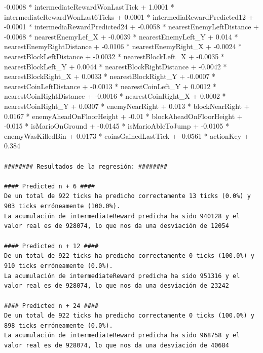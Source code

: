 \documentclass[10pt, spanish, pdftex]{../.template/template}
\begin{document}
{{   -0.0008 * intermediateRewardWonLastTick +
    1.0001 * intermediateRewardWonLast6Ticks +
    0.0001 * intermediaRewardPredicted12 +
   -0.0001 * intermediaRewardPredicted24 +
   -0.0058 * nearestEnemyLeftDistance +
   -0.0068 * nearestEnemyLef\_X +
   -0.0039 * nearestEnemyLeft\_Y +
    0.014  * nearestEnemyRightDistance +
   -0.0106 * nearestEnemyRight\_X +
   -0.0024 * nearestBlockLeftDistance +
   -0.0032 * nearestBlockLeft\_X +
   -0.0035 * nearestBlockLeft\_Y +
    0.0044 * nearestBlockRightDistance +
   -0.0042 * nearestBlockRight\_X +
    0.0033 * nearestBlockRight\_Y +
   -0.0007 * nearestCoinLeftDistance +
   -0.0013 * nearestCoinLeft\_Y +
    0.0012 * nearestCoinRightDistance +
   -0.0016 * nearestCoinRight\_X +
    0.0002 * nearestCoinRight\_Y +
    0.0307 * enemyNearRight +
    0.013  * blockNearRight +
    0.0167 * enemyAheadOnFloorHeight +
   -0.01   * blockAheadOnFloorHeight +
   -0.015  * isMarioOnGround +
   -0.0145 * isMarioAbleToJump +
   -0.0105 * enemyWasKilledBin +
    0.0173 * coinsGainedLastTick +
   -0.0561 * actionKey +
    0.384}
\newpage
{}\\\\
\texttt{\#\#\#\#\#\#\#\# Resultados de la regresión: \#\#\#\#\#\#\#\#\\\\
\#\#\#\# Predicted n + 6 \#\#\#\#\\
        De un total de 922 ticks ha predicho correctamente 13 ticks (0.0\%) y 903 ticks erróneamente (100.0\%).\\
        La acumulación de intermediateReward predicha ha sido 940128 y el valor real es de 928074, lo que nos da una desviación de 12054\\\\
        \#\#\#\# Predicted n + 12 \#\#\#\#\\
        De un total de 922 ticks ha predicho correctamente 0 ticks (100.0\%) y 910 ticks erróneamente (0.0\%).\\
        La acumulación de intermediateReward predicha ha sido 951316 y el valor real es de 928074, lo que nos da una desviación de 23242\\\\
        \#\#\#\# Predicted n + 24 \#\#\#\#\\
        De un total de 922 ticks ha predicho correctamente 0 ticks (100.0\%) y 898 ticks erróneamente (0.0\%).\\
        La acumulación de intermediateReward predicha ha sido 968758 y el valor real es de 928074, lo que nos da una desviación de 40684}

}
\end{document}
